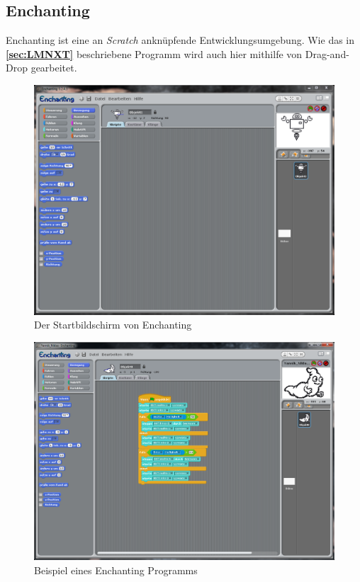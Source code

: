 \documentclass[paper=a4, pagesize, DIV=calc, BCOR=12.5mm, twoside=on, onecolumn=on, open = any, titlepage =on, parskip =half-, headsepline = on, footsepline = on, chapterprefix = on, appendixprefix = off, fontsize = 12pt, numbers = noenddot, abstract = on]{scrbook}
\numberwithin{equation}{chapter}
\theoremstyle{definition}
\theoremstyle{plain}
\theoremstyle{plain}
\theoremstyle{remark}
\theoremstyle{plain}
\theoremstyle{plain}
\begin{document}
\subsection{Enchanting}
\label{sec:enchanting}

Enchanting ist eine an \emph{Scratch} anknüpfende Entwicklungsumgebung. Wie das in \textbf{\ref{sec:LMNXT}} beschriebene Programm wird auch hier mithilfe von Drag-and-Drop gearbeitet. 

\begin{figure}
\includegraphics[scale=0.5]{images/Enchanting_Start.png} 
\caption{Der Startbildschirm von Enchanting}
\label{fig:Enchanting Start}
\end{figure}

\begin{figure}
\includegraphics[scale=0.45]{images/Beispielprogramm_Enchanting.png} 
\caption{Beispiel eines Enchanting Programms}
\label{fig:Bsp Enchanting}
\end{figure}
\end{document}
